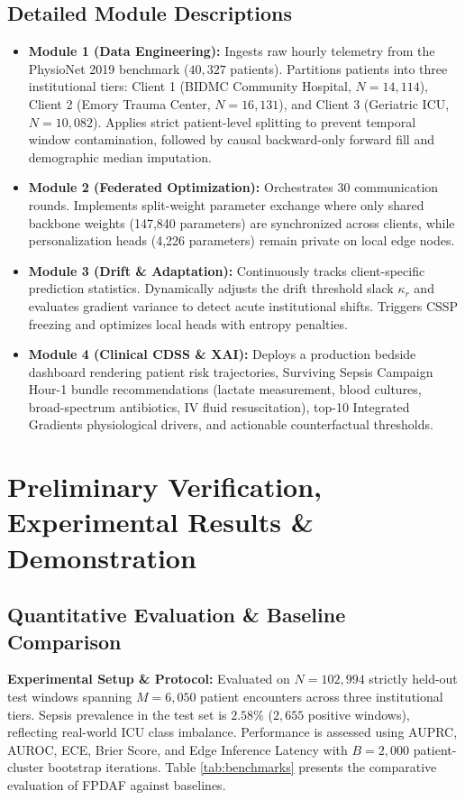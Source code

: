 \documentclass[11pt, a4paper]{article}
\begin{document}
\subsection{Detailed Module Descriptions}
\begin{itemize}[noitemsep, topsep=2pt]
    \item \textbf{Module 1 (Data Engineering):} Ingests raw hourly telemetry from the PhysioNet 2019 benchmark ($40,327$ patients). Partitions patients into three institutional tiers: Client 1 (BIDMC Community Hospital, $N=14,114$), Client 2 (Emory Trauma Center, $N=16,131$), and Client 3 (Geriatric ICU, $N=10,082$). Applies strict patient-level splitting to prevent temporal window contamination, followed by causal backward-only forward fill and demographic median imputation.
    \item \textbf{Module 2 (Federated Optimization):} Orchestrates 30 communication rounds. Implements split-weight parameter exchange where only shared backbone weights (147,840 parameters) are synchronized across clients, while personalization heads (4,226 parameters) remain private on local edge nodes.
    \item \textbf{Module 3 (Drift \& Adaptation):} Continuously tracks client-specific prediction statistics. Dynamically adjusts the drift threshold slack $\kappa_r$ and evaluates gradient variance to detect acute institutional shifts. Triggers CSSP freezing and optimizes local heads with entropy penalties.
    \item \textbf{Module 4 (Clinical CDSS \& XAI):} Deploys a production bedside dashboard rendering patient risk trajectories, Surviving Sepsis Campaign Hour-1 bundle recommendations (lactate measurement, blood cultures, broad-spectrum antibiotics, IV fluid resuscitation), top-10 Integrated Gradients physiological drivers, and actionable counterfactual thresholds.
\end{itemize}

\section{Preliminary Verification, Experimental Results \& Demonstration}

\subsection{Quantitative Evaluation \& Baseline Comparison}
\noindent
\textbf{Experimental Setup \& Protocol:} Evaluated on $N = 102,994$ strictly held-out test windows spanning $M = 6,050$ patient encounters across three institutional tiers. Sepsis prevalence in the test set is $2.58\%$ ($2,655$ positive windows), reflecting real-world ICU class imbalance. Performance is assessed using AUPRC, AUROC, ECE, Brier Score, and Edge Inference Latency with $B = 2,000$ patient-cluster bootstrap iterations. Table \ref{tab:benchmarks} presents the comparative evaluation of FPDAF against baselines.
\end{document}

